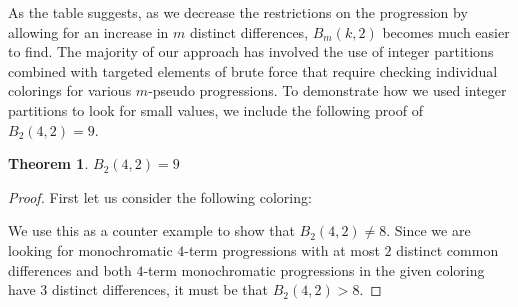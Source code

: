\documentclass[ fontsize=10pt,twoside]{scrartcl}	%
\newtheorem{theorem}{Theorem}
\begin{document}
\noindent As the table suggests, as we decrease the restrictions on the progression by allowing for an increase in $m$ distinct differences, $B_m(k,2)$ becomes much easier to find. The majority of our approach has involved the use of integer partitions combined with targeted elements of brute force that require checking individual colorings for various $m$-pseudo progressions. To demonstrate how we used integer partitions to look for small values, we include the following proof of $B_2(4,2) = 9$.

\begin{theorem}
$B_2(4,2) = 9$
\end{theorem}
\begin{proof}
First let us consider the following coloring: 
\begin{center}
\end{center}
We use this as a counter example to show that $B_2(4,2) \neq 8$. Since we are looking for monochromatic $4$-term progressions with at most $2$ distinct common differences and both $4$-term monochromatic progressions in the given coloring have $3$ distinct differences, it must be that $B_2(4,2)>8$.


\end{proof}
\end{document}
